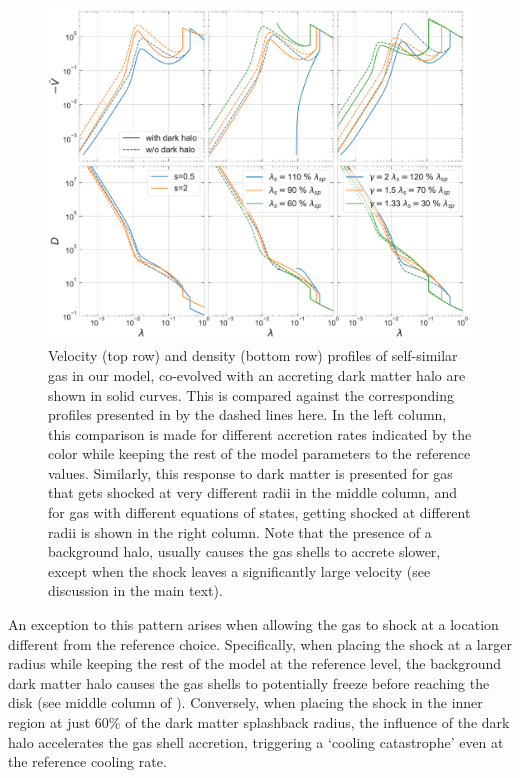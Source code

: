 \begin{figure}[htbp]
\centering
\includegraphics[width=\linewidth,trim={0 0.5cm 0cm 0},clip]{plots/profiles_gas_w-wo_halo_all.pdf}
\caption{Velocity (top row) and density (bottom row) profiles of self-similar gas in our model, co-evolved with an accreting dark matter halo are shown in solid curves. This is compared against the corresponding profiles presented in  by the dashed lines here. In the left column, this comparison is made for different accretion rates indicated by the color while keeping the rest of the model parameters to the reference values. Similarly, this response to dark matter is presented for gas that gets shocked at very different radii in the middle column, and for gas with different equations of states, getting shocked at different radii is shown in the right column. Note that the presence of a background halo, usually causes the gas shells to accrete slower, except when the shock leaves a significantly large velocity (see discussion in the main text).}
\label{fig:halo-influence-on-gas}
\end{figure}

An exception to this pattern arises when allowing the gas to shock at a location different from the reference choice. Specifically, when placing the shock at a larger radius while keeping the rest of the model at the reference level, the background dark matter halo causes the gas shells to potentially freeze before reaching the disk (see middle column of ). Conversely, when placing the shock in the inner region at just $60\%$ of the dark matter splashback radius, the influence of the dark halo accelerates the gas shell accretion, triggering a `cooling catastrophe' even at the reference cooling rate.

